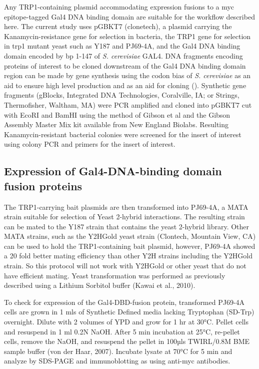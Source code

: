 \documentclass[11pt,fleqn]{book} %
\begin{document}
Any TRP1-containing plasmid accommodating expression fusions to a myc epitope-tagged Gal4 DNA binding domain are suitable for the workflow described here.  The current study uses pGBKT7 (clonetech), a plasmid carrying the Kanamycin-resistance gene for selection in bacteria, the TRP1 gene for selection in trp1 mutant yeast such as Y187 and PJ69-4A, and the Gal4 DNA binding domain encoded by bp 1-147 of \emph{S. cerevisiae} GAL4.  DNA fragments encoding proteins of interest to be cloned downstream of the Gal4 DNA binding domain region can be made by gene synthesis using the codon bias of \emph{S. cerevisiae} as an aid to ensure high level production and as an aid for cloning (\cite{ang2016multi}).  Synthetic gene fragments (gBlocks, Integrated DNA Technologies, Coralville, IA; or Strings, Thermofisher, Waltham, MA) were PCR amplified and cloned into pGBKT7 cut with EcoRI and BamHI using the method of Gibson et al and the Gibson Assembly Master Mix kit available from New England Biolabs.  Resulting Kanamycin-resistant bacterial colonies were screened for the insert of interest using colony PCR and primers for the insert of interest.

\subsection{Expression of Gal4-DNA-binding domain fusion proteins}

The TRP1-carrying bait plasmids are then transformed into PJ69-4A, a MATA strain suitable for selection of Yeast 2-hybrid interactions.  The resulting strain can be mated to the Y187 strain that contains the yeast 2-hybrid library.  Other MATA strains, such as the Y2HGold yeast strain (Clontech, Mountain View, CA) can be used to hold the TRP1-containing bait plasmid, however, PJ69-4A showed a 20 fold better mating efficiency than other Y2H strains including the Y2HGold strain. So this protocol will not work with Y2HGold or other yeast that do not have efficient mating. Yeast transformation was performed as previously described using a Lithium Sorbitol buffer (Kawai et al., 2010).


To check for expression of the Gal4-DBD-fusion protein, transformed PJ69-4A cells are grown in 1 mls of Synthetic Defined media lacking Tryptophan (SD-Trp) overnight.  Dilute with 2 volumes of YPD and grow for 1 hr at 30°C.  Pellet cells and resuspend in 1 ml 0.2N NaOH.  After 5 min incubation at 25°C, re-pellet cells, remove the NaOH, and resuspend the pellet in 100µls TWIRL/0.8M BME sample buffer (von der Haar, 2007).  Incubate lysate at 70°C for 5 min and analyze by SDS-PAGE and immunoblotting as using anti-myc antibodies.  
\end{document}
